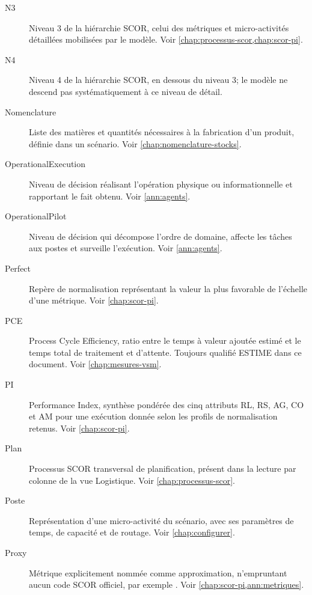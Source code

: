 \begin{description}
\item[N3] Niveau 3 de la hiérarchie SCOR, celui des métriques et micro-activités détaillées mobilisées par le modèle. Voir \cref{chap:processus-scor,chap:scor-pi}.

\item[N4] Niveau 4 de la hiérarchie SCOR, en dessous du niveau 3; le modèle ne descend pas systématiquement à ce niveau de détail.

\item[Nomenclature] Liste des matières et quantités nécessaires à la fabrication d'un produit, définie dans un scénario. Voir \cref{chap:nomenclature-stocks}.

\item[OperationalExecution] Niveau de décision réalisant l'opération physique ou informationnelle et rapportant le fait obtenu. Voir \cref{ann:agents}.

\item[OperationalPilot] Niveau de décision qui décompose l'ordre de domaine, affecte les tâches aux postes et surveille l'exécution. Voir \cref{ann:agents}.

\item[Perfect] Repère de normalisation représentant la valeur la plus favorable de l'échelle d'une métrique. Voir \cref{chap:scor-pi}.

\item[PCE] Process Cycle Efficiency, ratio entre le temps à valeur ajoutée estimé et le temps total de traitement et d'attente. Toujours qualifié ESTIME dans ce document. Voir \cref{chap:mesures-vsm}.

\item[PI] Performance Index, synthèse pondérée des cinq attributs RL, RS, AG, CO et AM pour une exécution donnée selon les profils de normalisation retenus. Voir \cref{chap:scor-pi}.

\item[Plan] Processus SCOR transversal de planification, présent dans la lecture par colonne de la vue Logistique. Voir \cref{chap:processus-scor}.

\item[Poste] Représentation d'une micro-activité du scénario, avec ses paramètres de temps, de capacité et de routage. Voir \cref{chap:configurer}.

\item[Proxy] Métrique explicitement nommée comme approximation, n'empruntant aucun code SCOR officiel, par exemple . Voir \cref{chap:scor-pi,ann:metriques}.


\end{description}
